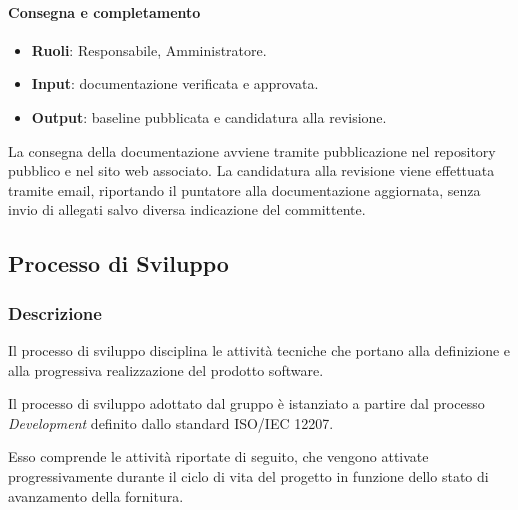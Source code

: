 \paragraph{Consegna e completamento}

\begin{itemize}
    \item \textbf{Ruoli}: Responsabile, Amministratore.
    \item \textbf{Input}: documentazione verificata e approvata.
    \item \textbf{Output}: baseline pubblicata e candidatura alla revisione.
\end{itemize}

La consegna della documentazione avviene tramite pubblicazione nel repository
pubblico e nel sito web associato. La candidatura alla revisione viene effettuata
tramite email, riportando il puntatore alla documentazione aggiornata, senza invio
di allegati salvo diversa indicazione del committente.


\subsection{Processo di Sviluppo}
\label{sec:sviluppo}

\subsubsection{Descrizione}

Il processo di sviluppo disciplina le attività tecniche che portano alla definizione
e alla progressiva realizzazione del prodotto software.

Il processo di sviluppo adottato dal gruppo è istanziato a partire dal processo
\textit{Development} definito dallo standard ISO/IEC 12207.

Esso comprende le attività riportate di seguito, che vengono attivate
progressivamente durante il ciclo di vita del progetto in funzione dello stato
di avanzamento della fornitura.

